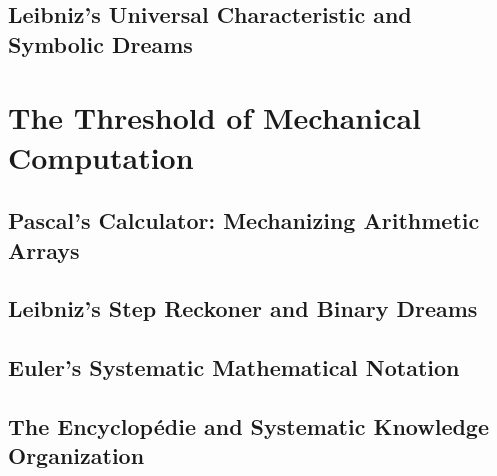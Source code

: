 \documentclass[12pt, oneside, openany]{book}
\begin{document}
\section{Leibniz's Universal Characteristic and Symbolic Dreams}


\chapter{The Threshold of Mechanical Computation}

\section{Pascal's Calculator: Mechanizing Arithmetic Arrays}

\section{Leibniz's Step Reckoner and Binary Dreams}

\section{Euler's Systematic Mathematical Notation}

\section{The Encyclopédie and Systematic Knowledge Organization}

\end{document}
